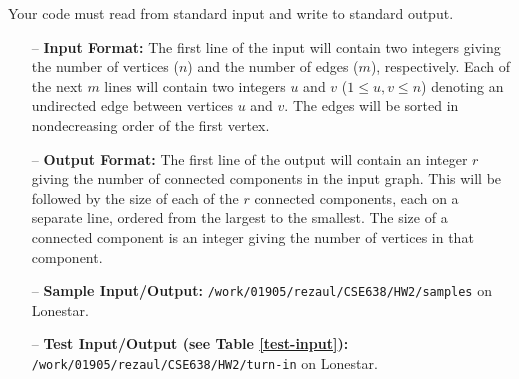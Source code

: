 \documentclass[11pt]{article}
\begin{document}
 Your code must read from standard input and write to standard output.
%
 \begin{itemize}
%
\vspace{-0.1cm}
 \item[--] {\bf Input Format:} The first line of the input will contain two integers giving the number of vertices ($n$)
 and the number of edges ($m$), respectively. Each of the next $m$ lines will contain two integers $u$ and $v$ ($1 \leq u, v \leq n$)
denoting an undirected edge between vertices $u$ and $v$. The edges will be sorted in nondecreasing order of the first vertex.
%
\vspace{-0.1cm}
 \item[--] {\bf Output Format:} The first line of the output will contain an integer $r$
giving the number of connected components in the input graph. This will be followed
by the size of each of the $r$ connected components, each on a separate line, ordered from the
largest to the smallest. The size
of a connected component is an integer giving the number of vertices in that component.
%
\vspace{-0.1cm}
 \item[--] {\bf Sample Input/Output:} {\tt /work/01905/rezaul/CSE638/HW2/samples} on Lonestar.
%
\vspace{-0.1cm}
 \item[--] {\bf Test Input/Output (see Table \ref{test-input}):} {\tt /work/01905/rezaul/CSE638/HW2/turn-in} on Lonestar.
%
 \end{itemize}
\end{document}
